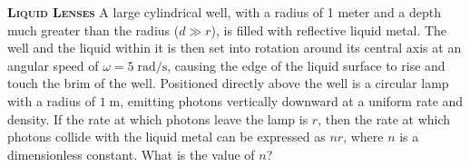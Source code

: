 \begin{problem}
{\textbf{\textsc{Liquid Lenses}}} A large cylindrical well, with a radius of 1 meter and a depth much greater than the radius ($d \gg r$), is filled with reflective liquid metal. The well and the liquid within it is then set into rotation around its central axis at an angular speed of $\omega = 5\;\mathrm{rad/s}$, causing the edge of the liquid surface to rise and touch the brim of the well. Positioned directly above the well is a circular lamp with a radius of $1\;\mathrm{m}$, emitting photons vertically downward at a uniform rate and density. If the rate at which photons leave the lamp is $r$, then the rate at which photons collide with the liquid metal can be expressed as $nr$, where $n$ is a dimensionless constant. What is the value of $n$?

\end{problem}